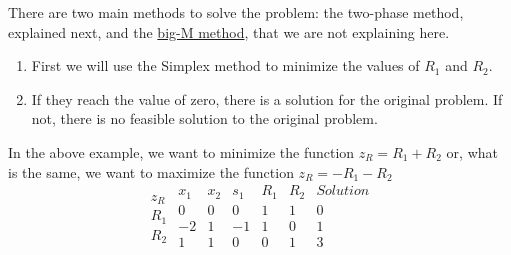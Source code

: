   There are two main methods to solve the problem: the two-phase method, explained next, and the \href{https://www.youtube.com/watch?v=btjxqq-vMOg}{big-M method}, that we are not explaining here.


  \begin{enumerate}
    \item First we will use the Simplex method to minimize the values of $R_1$ and $R_2$. 
    \item If they reach the value of zero, there is a solution for the original problem. If not, there is no feasible solution to the original problem.
  \end{enumerate}
  In the above example, we want to minimize the function $z_R=R_1+R_2$ or, what is the same, we want to maximize the function $z_R=-R_1-R_2$
  \begin{equation*}
    \begin{array}{c}
    \\
    z_R\\
    R_1\\
    R_2\\
    \end{array}
    \begin{array}{ccccc|c}
       x_1 & x_2 & s_1 & R_1 & R_2 & Solution \\ \hline
       0 & 0 & 0 & 1 & 1 & 0 \\ \hline
       -2 & 1 & -1 & 1 & 0 & 1  \\
       1 & 1 & 0 & 0 & 1 & 3 \\
    \end{array}
    \end{equation*}

